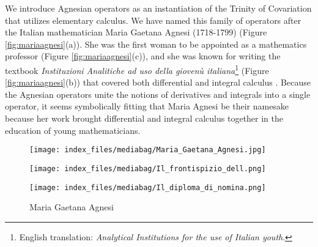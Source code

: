 \documentclass[
  letterpaper,
  DIV=11,
  numbers=noendperiod]{scrreprt}
\begin{document}
We introduce Agnesian operators as an instantiation of the Trinity of
Covariation that utilizes elementary calculus. We have named this family
of operators after the Italian mathematician Maria Gaetana Agnesi
(1718-1799) (Figure \ref{fig:mariaagnesi}(a))\cite{Dumbaugh2019}. She
was the first woman to be appointed as a mathematics professor (Figure
\ref{fig:mariaagnesi}(c)), and she was known for writing the textbook
\textit{Instituzioni Analitiche ad uso della gioven\`{u} italiana}\footnote{English translation: \textit{Analytical Institutions for the use of Italian youth}.}
(Figure \ref{fig:mariaagnesi}(b)) that covered both differential and
integral calculus \cite{Dumbaugh2019}. Because the Agnesian operators
unite the notions of derivatives and integrals into a single operator,
it seems symbolically fitting that Maria Agnesi be their namesake
because her work brought differential and integral calculus together in
the education of young mathematicians.

\begin{figure}

\begin{minipage}{0.33\linewidth}

\texttt{[image: index\_files/mediabag/Maria\_Gaetana\_Agnesi.jpg]}

\end{minipage}%
%
\begin{minipage}{0.33\linewidth}
\texttt{[image: index\_files/mediabag/Il\_frontispizio\_dell.png]}\end{minipage}%
%
\begin{minipage}{0.33\linewidth}

\texttt{[image: index\_files/mediabag/Il\_diploma\_di\_nomina.png]}

\end{minipage}%

\caption{\label{fig-maria-gaetana-agnesi}Maria Gaetana Agnesi}

\end{figure}%
\end{document}
